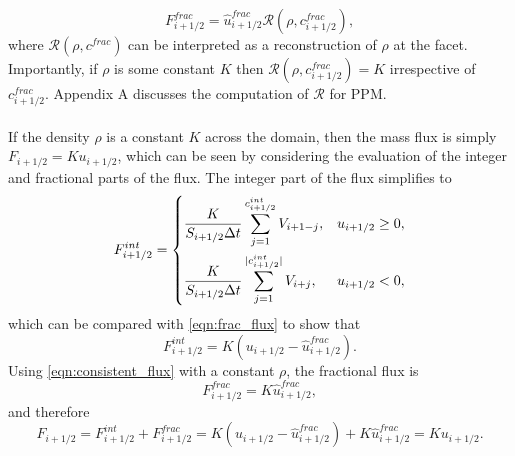\documentclass{ametsocV6.1}
\begin{document}
\begin{equation} \label{eqn:consistent_flux}
F_{i+1/2}^{frac} = \widehat{u}_{i+1/2}^{frac} \mathcal{R}(\rho,c_{i+1/2}^{frac}),
\end{equation}
where $\mathcal{R}(\rho,c^{frac})$ can be interpreted as a reconstruction of $\rho$ at the facet.
Importantly, if $\rho$ is some constant $K$ then $\mathcal{R}(\rho,c_{i+1/2}^{frac})=K$ irrespective of $c_{i+1/2}^{frac}$.
Appendix A discusses the computation of $\mathcal{R}$ for PPM. \\
\\
If the density $\rho$ is a constant $K$ across the domain, then the mass flux is simply $F_{i+1/2}=Ku_{i+1/2}$, which can be seen by considering the evaluation of the integer and fractional parts of the flux.
The integer part of the flux simplifies to
\begin{equation}
    F^{int}_{i+1/2} = 
    \begin{dcases}
        \frac{K}{S_{i+1/2}\Delta{t}}\sum_{j=1}^{c_{i+1/2}^{int}}  V_{i+1-j}, & u_{i+1/2} \geq 0, \\
        \frac{K}{S_{i+1/2}\Delta{t}}\sum_{j=1}^{|c_{i+1/2}^{int}|} V_{i+j}, & u_{i+1/2} < 0,
    \end{dcases}
\end{equation}
which can be compared with \eqref{eqn:frac_flux} to show that
\begin{equation}
F^{int}_{i+1/2} = K\left(u_{i+1/2} - \widehat{u}^{frac}_{i+1/2}\right).
\end{equation}
Using \eqref{eqn:consistent_flux} with a constant $\rho$, the fractional flux is
\begin{equation}
F^{frac}_{i+1/2}=K\widehat{u}^{frac}_{i+1/2},
\end{equation}
and therefore
\begin{equation}
F_{i+1/2}=F^{int}_{i+1/2}+F_{i+1/2}^{frac} = K\left(u_{i+1/2} - \widehat{u}^{frac}_{i+1/2}\right) + K\widehat{u}^{frac}_{i+1/2} = Ku_{i+1/2}.
\end{equation}
\end{document}
